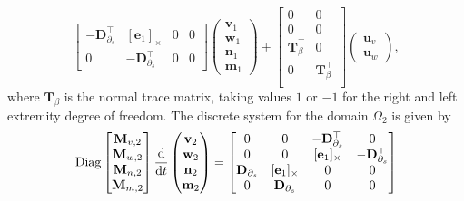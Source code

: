 \documentclass[11pt,a4paper]{article}
\begin{document}
{\begin{equation}
\begin{bmatrix}
        -\mathbf{D}_{\partial_s}^\top & [\mathbf{e}_{1}]_\times & 0 & 0 \\
        0 & -\mathbf{D}_{\partial_s}^\top & 0 & 0
    \end{bmatrix}
    \begin{pmatrix}
        \mathbf{v}_1 \\
        \mathbf{w}_1 \\
        \mathbf{n}_1 \\
        \mathbf{m}_1
    \end{pmatrix} + \begin{bmatrix}
        0 & 0 \\
        0 & 0 \\
         \mathbf{T}_{\beta}^\top & 0 \\
        0 & \mathbf{T}_{\beta}^\top \\
    \end{bmatrix}\begin{pmatrix}
        \mathbf{u}_v \\
        \mathbf{u}_w
    \end{pmatrix},
\end{equation}
where $\mathbf{T}_{\beta}$ is the normal trace matrix, taking values $1$ or $-1$ for the right and left extremity degree of freedom. The discrete system for the domain $\Omega_2$ is given by
\begin{equation}\label{eq:discrete_free_intrinsic}
\mathrm{Diag}
\begin{bmatrix}
\mathbf{M}_{v, 2} \\ 
\mathbf{M}_{w, 2} \\
\mathbf{M}_{n, 2} \\
\mathbf{M}_{m, 2}
\end{bmatrix}
    \odv{}{t}
    \begin{pmatrix}
        \mathbf{v}_2 \\
        \mathbf{w}_2 \\
        \mathbf{n}_2 \\
        \mathbf{m}_2
    \end{pmatrix} = 
    \begin{bmatrix}
        0 & 0 & -\mathbf{D}_{\partial_s}^\top & 0 \\
        0 & 0 & [\mathbf{e}_{1}]_\times & -\mathbf{D}_{\partial_s}^\top \\
        \mathbf{D}_{\partial_s} & [\mathbf{e}_{1}]_\times & 0 & 0 \\
        0 & \mathbf{D}_{\partial_s} & 0 & 0
    \end{bmatrix}

\end{equation}}
\end{document}
